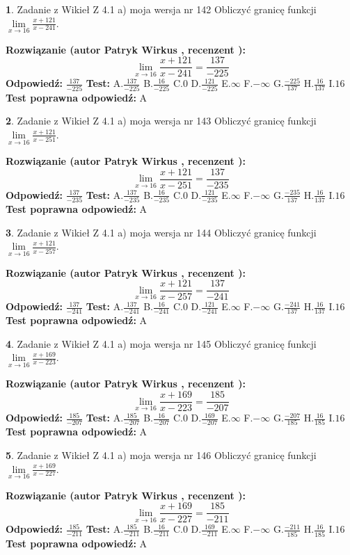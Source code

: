 \documentclass[12pt, a4paper]{article}
\theoremstyle{definition} %
\newtheorem{zad}{}
\newcommand{\zadStart}[1]{\begin{zad}#1\newline}
\newcommand{\zadStop}{\end{zad}}
\newcommand{\rozwStart}[2]{\noindent \textbf{Rozwiązanie (autor #1 , recenzent #2): }\newline}
\newcommand{\rozwStop}{\newline}
\newcommand{\odpStart}{\noindent \textbf{Odpowiedź:}\newline}
\newcommand{\odpStop}{\newline}
\newcommand{\testStart}{\noindent \textbf{Test:}\newline}
\newcommand{\testStop}{\newline}
\newcommand{\kluczStart}{\noindent \textbf{Test poprawna odpowiedź:}\newline}
\newcommand{\kluczStop}{\newline}
\begin{document}
\zadStart{Zadanie z Wikieł Z 4.1 a) moja wersja nr 142}
Obliczyć granicę funkcji $\lim\limits_{x\to16}\frac{x+121}{x-241}$.
\zadStop
\rozwStart{Patryk Wirkus}{}
$$\lim\limits_{x\to16}\frac{x+121}{x-241} = \frac{137}{-225}$$
\rozwStop
\odpStart
$\frac{137}{-225}$
\odpStop
\testStart
A.$\frac{137}{-225}$
B.$\frac{16}{-225}$
C.$0$
D.$\frac{121}{-225}$
E.$\infty$
F.$-\infty$
G.$\frac{-225}{137}$
H.$\frac{16}{137}$
I.$16$
\testStop
\kluczStart
A
\kluczStop



\zadStart{Zadanie z Wikieł Z 4.1 a) moja wersja nr 143}
Obliczyć granicę funkcji $\lim\limits_{x\to16}\frac{x+121}{x-251}$.
\zadStop
\rozwStart{Patryk Wirkus}{}
$$\lim\limits_{x\to16}\frac{x+121}{x-251} = \frac{137}{-235}$$
\rozwStop
\odpStart
$\frac{137}{-235}$
\odpStop
\testStart
A.$\frac{137}{-235}$
B.$\frac{16}{-235}$
C.$0$
D.$\frac{121}{-235}$
E.$\infty$
F.$-\infty$
G.$\frac{-235}{137}$
H.$\frac{16}{137}$
I.$16$
\testStop
\kluczStart
A
\kluczStop



\zadStart{Zadanie z Wikieł Z 4.1 a) moja wersja nr 144}
Obliczyć granicę funkcji $\lim\limits_{x\to16}\frac{x+121}{x-257}$.
\zadStop
\rozwStart{Patryk Wirkus}{}
$$\lim\limits_{x\to16}\frac{x+121}{x-257} = \frac{137}{-241}$$
\rozwStop
\odpStart
$\frac{137}{-241}$
\odpStop
\testStart
A.$\frac{137}{-241}$
B.$\frac{16}{-241}$
C.$0$
D.$\frac{121}{-241}$
E.$\infty$
F.$-\infty$
G.$\frac{-241}{137}$
H.$\frac{16}{137}$
I.$16$
\testStop
\kluczStart
A
\kluczStop



\zadStart{Zadanie z Wikieł Z 4.1 a) moja wersja nr 145}
Obliczyć granicę funkcji $\lim\limits_{x\to16}\frac{x+169}{x-223}$.
\zadStop
\rozwStart{Patryk Wirkus}{}
$$\lim\limits_{x\to16}\frac{x+169}{x-223} = \frac{185}{-207}$$
\rozwStop
\odpStart
$\frac{185}{-207}$
\odpStop
\testStart
A.$\frac{185}{-207}$
B.$\frac{16}{-207}$
C.$0$
D.$\frac{169}{-207}$
E.$\infty$
F.$-\infty$
G.$\frac{-207}{185}$
H.$\frac{16}{185}$
I.$16$
\testStop
\kluczStart
A
\kluczStop



\zadStart{Zadanie z Wikieł Z 4.1 a) moja wersja nr 146}
Obliczyć granicę funkcji $\lim\limits_{x\to16}\frac{x+169}{x-227}$.
\zadStop
\rozwStart{Patryk Wirkus}{}
$$\lim\limits_{x\to16}\frac{x+169}{x-227} = \frac{185}{-211}$$
\rozwStop
\odpStart
$\frac{185}{-211}$
\odpStop
\testStart
A.$\frac{185}{-211}$
B.$\frac{16}{-211}$
C.$0$
D.$\frac{169}{-211}$
E.$\infty$
F.$-\infty$
G.$\frac{-211}{185}$
H.$\frac{16}{185}$
I.$16$
\testStop
\kluczStart
A
\kluczStop
\end{document}
